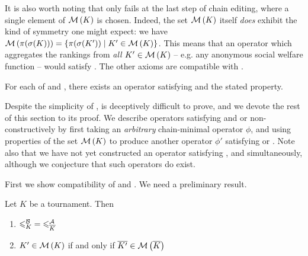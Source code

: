 It is also worth noting that \anon{} only fails at the last step of
chain editing, where a single element of $\operatorname{\mathcal{M}}\left({K}\right)$ is chosen. Indeed, the set
$\operatorname{\mathcal{M}}\left({K}\right)$ itself \emph{does} exhibit the kind of symmetry one might expect:
we have $\operatorname{\mathcal{M}}\left({\pi(\sigma(K))}\right) = \{\pi(\sigma(K')) \mid K' \in \operatorname{\mathcal{M}}\left({K}\right)\}$.
This means that an operator which aggregates the rankings from \emph{all} $K'
\in \operatorname{\mathcal{M}}\left({K}\right)$ -- e.g. any anonymous social welfare function --
would satisfy \anon{}. The other axioms are compatible with
\chainmin{}.

\begin{theorem}
    \label{tourn_result_chainmin_axiom_compatibilities}

    For each of \dualaxiom{} and \mon{}, there exists an operator
    satisfying \chainmin{} and the stated property.

\end{theorem}

Despite the simplicity of \mon{},
 is deceptively difficult to
prove, and we devote the rest of this section to its proof. We describe
operators satisfying \chaindef{} and \dualaxiom{} or \mon{}
non-constructively by first taking an \emph{arbitrary} chain-minimal operator
$\phi$, and using properties of the set $\operatorname{\mathcal{M}}\left({K}\right)$ to produce another operator
$\phi'$ satisfying \dualaxiom{} or \mon{}. Note also that we have
not yet constructed an operator satisfying \dualaxiom{}, \mon{} and
\chainmin{} simultaneously, although we conjecture that such operators
do exist.

First we show compatibility of \chainmin{} and \dualaxiom{}. We
need a preliminary result.

\begin{lemma}
    \label{tourn_result_chainmin_dual_lemma}
    Let $K$ be a tournament. Then
    \begin{enumerate}
        \item ${\leqslant^{\mathcal{B}}_K} = {\leqslant^{\mathcal{A}}_{{\overline{K}}}}$ \label{tourn_item_dual_lemma_nle}
        \item $K' \in \operatorname{\mathcal{M}}\left({K}\right)$ if and only if ${\overline{K'}} \in
              \operatorname{\mathcal{M}}\left({{\overline{K}}}\right)$
              \label{tourn_item_dual_lemma_minch}
    \end{enumerate}
\end{lemma}


